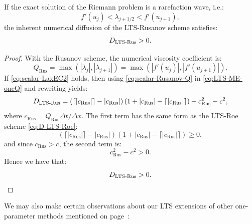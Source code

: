 \begin{proposition} \label{prop:LTS-Rus-D}
If the exact solution of the Riemann problem is a rarefaction wave, i.e.:
\begin{equation} \label{eq:scalar-LaxEC2}
f'(u_j) < \lambda_{j+1/2} < f'(u_{j+1}),
\end{equation}
the inherent numerical diffusion of the LTS-Rusanov scheme satisfies:
\begin{equation}
D_\textup{LTS-Rus} > 0.
\end{equation}
\end{proposition}
\begin{proof}
With the Rusanov scheme, the numerical viscosity coefficient is:
\begin{equation} \label{eq:scalar-Rusanov-Q}
Q_\text{Rus} = \max \left( |\lambda_j|, |\lambda_{j+1}| \right) = \max \left( |f'(u_j)|, |f'(u_{j+1})| \right).
\end{equation}
If \eqref{eq:scalar-LaxEC2} holds, then using \eqref{eq:scalar-Rusanov-Q} in \eqref{eq:LTS-ME-oneQ} and rewriting yields:
\begin{equation}
D_\textup{LTS-Rus} = \left( \lceil |c_\text{Rus}| \rceil - |c_\text{Rus}| \right) \left( 1 + |c_\text{Rus}| - \lceil |c_\text{Rus}| \rceil \right) + c_\text{Rus}^2 - c^2,
\end{equation}
where $ c_\text{Rus} = Q_\text{Rus} \Delta t / \Delta x $. The first term has the same form as the LTS-Roe scheme \eqref{eq:D-LTS-Roe}:
\begin{equation}
\left( \lceil |c_\text{Rus}| \rceil - |c_\text{Rus}| \right) \left( 1 + |c_\text{Rus}| - \lceil |c_\text{Rus}| \rceil \right) \geq 0,
\end{equation}
and since $ c_\text{Rus} > c $, the second term is:
\begin{equation}
c_\text{Rus}^2 - c^2 > 0.
\end{equation}
Hence we have that:
\begin{equation}
D_\textup{LTS-Rus} > 0.
\end{equation}
\end{proof}
We may also make certain observations about our LTS extensions of other one-parameter methods mentioned on page~\pageref{eq:LTS-1p-itemize}:

